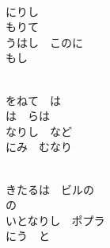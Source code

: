\documentclass[10pt,b5j]{tarticle} %
\begin{document}
\vspace{1.5em} %
\newcommand{\linespace}{0.5em} %
\newcommand{\blocksize}{0.5\hsize} %
\newcommand{\itemmargin}{3em} %
\begin{enumerate} %
    \setlength{\itemindent}{\itemmargin} %
    \begin{minipage}[c]{\blocksize}
    
        \vspace{\linespace}
        \item~\\
        にりし　\\
        もりて　\\
        うはし　このに\\
        もし　
        
    \end{minipage}
    \begin{minipage}[c]{\blocksize}
        
        \vspace{\linespace}
        \item~\\
        をねて　は\\
        は　らは\\
        なりし　など\\
        にみ　むなり
        
    \end{minipage}
    \begin{minipage}[c]{\blocksize}
        
        \vspace{\linespace}
        \item~\\
        きたるは　ビルの\\
        の　　\\
        いとなりし　ポプラ\\
        にう　と
        

\end{minipage}
\end{enumerate}
\end{document}
